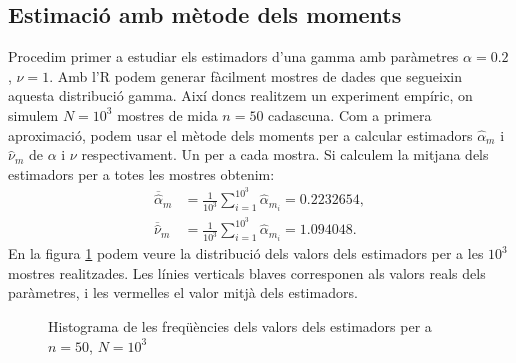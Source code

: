 \documentclass[12pt, catalan]{article}
\numberwithin{table}{section}
\numberwithin{figure}{section}
\numberwithin{equation}{section}
\begin{document}
\subsection{Estimació amb mètode dels moments}
Procedim primer a estudiar els estimadors d'una gamma amb paràmetres $\alpha=0.2$, $\nu=1$. Amb l'R podem generar fàcilment mostres de dades que segueixin aquesta distribució gamma. Així doncs realitzem un experiment empíric, on simulem $N=10^3$ mostres de mida $n=50$ cadascuna.
Com a primera aproximació, podem usar el mètode dels moments per a calcular estimadors $\hat{\alpha}_m$ i $\hat{\nu}_m$ de $\alpha$ i $\nu$ respectivament. Un per a cada mostra.  Si calculem la mitjana dels estimadors per a totes les mostres obtenim:
\begin{align*}
    \overline{\hat{\alpha}}_m&=\frac{1}{10^3}\sum_{i=1}^{10^3}\hat{\alpha}_{m_i}= 0.2232654,\\
    \overline{\hat{\nu}}_m&=\frac{1}{10^3}\sum_{i=1}^{10^3}\hat{\alpha}_{m_i}= 1.094048.
\end{align*}
En la figura \ref{first} podem veure la distribució dels valors dels estimadors per a les $10^3$ mostres realitzades. Les línies verticals blaves corresponen als valors reals dels paràmetres, i les vermelles el valor mitjà dels estimadors.
\begin{figure}[ht]
  \hfill
  \caption{Histograma de les freqüències dels valors dels estimadors per a $n=50$, $N=10^3$}
  \label{first}
\end{figure}
  
\end{document}
